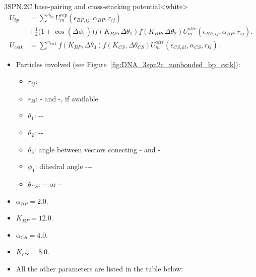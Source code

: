 \begin{smallpage}{3SPN.2C base-pairing and cross-stacking potential}<white>
  \vspace{-1em}
  \begin{align}
    U_{bp} &= \sum^{n_{bp}} U_m^{rep}(\epsilon_{BP, ij}, \alpha_{BP}, r_{ij}) \nonumber \\
           &+ \frac{1}{2} \big( 1+\cos(\Delta \phi_1) \big)
             f(K_{BP}, \Delta\theta_{1})
             f(K_{BP}, \Delta\theta_{2})
             U_m^{attr} (\epsilon_{BP, ij}, \alpha_{BP}, r_{ij}).
             \label{eq:dna_3spn2c_nonlocal_base_pairing} \\[.5em]
    U_{cstk} &= \sum^{n_{cstk}} f(K_{BP}, \Delta\theta_{3})
               f(K_{CS}, \Delta\theta_{CS})
               U_m^{attr} (\epsilon_{CS, kl}, \alpha_{CS}, r_{kl}).
               \label{eq:dna_3spn2c_nonlocal_cross_stacking}
  \end{align}
  \tcblower
  \begin{itemize}
  \item Particles involved (see Figure~\ref{fig:DNA_3spn2c_nonbonded_bp_cstk}):
    \begin{itemize}
    \item $r_{ij}$: -
    \item $r_{kl}$: - and -, if available
    \item $\theta_{1}$: --
    \item $\theta_{2}$: --
    \item $\theta_{3}$: angle between vectors conecting - and -
    \item $\phi_{1}$: dihedral angle ---
    \item $\theta_{CS}$: -- or --
    \end{itemize}
  \item $\alpha_{BP} = 2.0$.
  \item $K_{BP} = 12.0$.
  \item $\alpha_{CS} = 4.0$.
  \item $K_{CS} = 8.0$.
  \item All the other parameters are listed in the table below:
  \end{itemize}
  \begin{center}
    \begin{footnotesize}

\end{footnotesize}
\end{center}
\end{smallpage}
